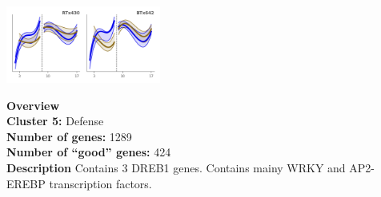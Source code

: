\begin{multicols}{2}
\includegraphics[width=2in]{figures/clusters/leaf_Preflowering_4.png}
\columnbreak

\noindent \textbf{Overview}\\\textbf{Cluster 5:} Defense \\
\textbf{Number of genes:} 1289 \\
\textbf{Number of ``good'' genes:} 424 \\
\textbf{Description} Contains 3 DREB1 genes. Contains mainy WRKY and AP2-EREBP transcription factors. \\
\end{multicols}

